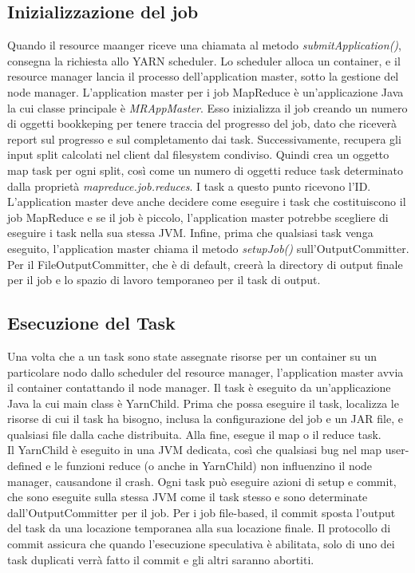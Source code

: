 \subsection{Inizializzazione del job}
Quando il resource maanger riceve una chiamata al metodo \textit{submitApplication()}, consegna la richiesta allo YARN scheduler. Lo scheduler alloca un container, e il resource manager lancia il processo dell'application master, sotto la gestione del node manager. L'application master per i job MapReduce è un'applicazione Java la cui classe principale è \textit{MRAppMaster}. Esso inizializza il job creando un numero di oggetti bookkeping per tenere traccia del progresso del job, dato che riceverà report sul progresso e sul completamento dai task. Successivamente, recupera gli input split calcolati nel client dal filesystem condiviso. Quindi crea un oggetto map task per ogni split, così come un numero di oggetti reduce task determinato dalla proprietà \textit{mapreduce.job.reduces}. I task a questo punto ricevono l'ID. L'application master deve anche decidere come eseguire i task che costituiscono il job MapReduce e se il job è piccolo, l'application master potrebbe scegliere di eseguire i task nella sua stessa JVM. Infine, prima che qualsiasi task venga eseguito, l'application master chiama il metodo \textit{setupJob()} sull'OutputCommitter. Per il FileOutputCommitter, che è di default, creerà la directory di output finale per il job e lo spazio di lavoro temporaneo per il task di output.
\subsection{Esecuzione del Task}
Una volta che a un task sono state assegnate risorse per un container su un particolare nodo dallo scheduler del resource manager, l'application master avvia il container contattando il node manager. Il task è eseguito da un'applicazione Java la cui main class è YarnChild. Prima che possa eseguire il task, localizza le risorse di cui il task ha bisogno, inclusa la configurazione del job e un JAR file, e qualsiasi file dalla cache distribuita. Alla fine, esegue il map o il reduce task. \\
Il YarnChild è eseguito in una JVM dedicata, così che qualsiasi bug nel map user-defined e le funzioni reduce (o anche in YarnChild) non influenzino il node manager, causandone il crash.\newline
Ogni task può eseguire azioni di setup e commit, che sono eseguite sulla stessa JVM come il task stesso e sono determinate dall'OutputCommitter per il job. Per i job file-based, il commit sposta l'output del task da una locazione temporanea alla sua locazione finale. Il protocollo di commit assicura che quando l'esecuzione speculativa è abilitata, solo di uno dei task duplicati verrà fatto il commit e gli altri saranno abortiti.
